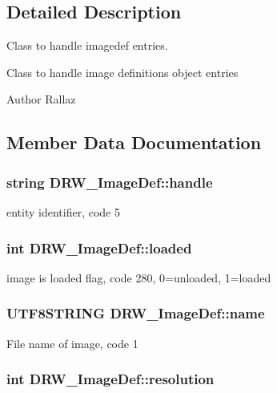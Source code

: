 \subsection{Detailed Description}
Class to handle imagedef entries. 

Class to handle image definitions object entries \begin{DoxyAuthor}{Author}
Rallaz 
\end{DoxyAuthor}


\subsection{Member Data Documentation}
\hypertarget{classDRW__ImageDef_a55f309b610121bcdb03f131907254cac}{
\subsubsection[{handle}]{\setlength{\rightskip}{0pt plus 5cm}string D\-R\-W\-\_\-\-Image\-Def\-::handle}}\label{classDRW__ImageDef_a55f309b610121bcdb03f131907254cac}
entity identifier, code 5 \hypertarget{classDRW__ImageDef_a2265a01592e1b25b1a4c6294423f76f6}{
\subsubsection[{loaded}]{\setlength{\rightskip}{0pt plus 5cm}int D\-R\-W\-\_\-\-Image\-Def\-::loaded}}\label{classDRW__ImageDef_a2265a01592e1b25b1a4c6294423f76f6}
image is loaded flag, code 280, 0=unloaded, 1=loaded \hypertarget{classDRW__ImageDef_abd0cb813e416eba0b541beb90ba8a1c4}{
\subsubsection[{name}]{\setlength{\rightskip}{0pt plus 5cm}U\-T\-F8\-S\-T\-R\-I\-N\-G D\-R\-W\-\_\-\-Image\-Def\-::name}}\label{classDRW__ImageDef_abd0cb813e416eba0b541beb90ba8a1c4}
File name of image, code 1 \hypertarget{classDRW__ImageDef_a4bc6163d679744d2f58c00cb5d6573b0}{
\subsubsection[{resolution}]{\setlength{\rightskip}{0pt plus 5cm}int D\-R\-W\-\_\-\-Image\-Def\-::resolution}}\label{classDRW__ImageDef_a4bc6163d679744d2f58c00cb5d6573b0}
